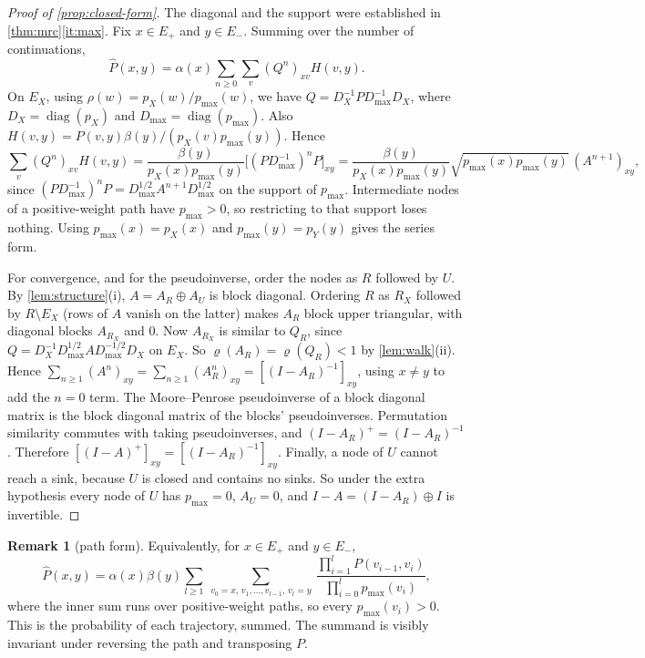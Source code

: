 \documentclass[11pt]{article}
\theoremstyle{definition}
\newtheorem{remark}[theorem]{Remark}
\newcommand{\pX}{p_X}
\newcommand{\pY}{p_Y}
\newcommand{\hP}{\hat P}
\newcommand{\pmax}{p_{\max}}
\newcommand{\Ep}{E_{+}}
\newcommand{\Em}{E_{-}}
\begin{document}
\begin{proof}[Proof of \cref{prop:closed-form}]
The diagonal and the support were established in
\cref{thm:mrc}\ref{it:max}. Fix $x\in\Ep$ and $y\in\Em$. Summing over the
number of continuations,
\[
  \hP(x,y)=\alpha(x)\sum_{n\ge0}\sum_{v}(Q^n)_{xv}H(v,y).
\]
On $E_X$, using $\rho(w)=\pX(w)/\pmax(w)$, we have
$Q=D_X^{-1}PD_{\max}^{-1}D_X$, where $D_X=\operatorname{diag}(\pX)$ and
$D_{\max}=\operatorname{diag}(\pmax)$. Also
$H(v,y)=P(v,y)\beta(y)/(\pX(v)\pmax(y))$. Hence
\[
  \sum_v(Q^n)_{xv}H(v,y)=\frac{\beta(y)}{\pX(x)\pmax(y)}\bigl[(PD_{\max}^{-1})^nP\bigr]_{xy}
  =\frac{\beta(y)}{\pX(x)\pmax(y)}\sqrt{\pmax(x)\pmax(y)}\,(A^{n+1})_{xy},
\]
since $(PD_{\max}^{-1})^nP=D_{\max}^{1/2}A^{n+1}D_{\max}^{1/2}$ on the support of
$\pmax$. Intermediate nodes of a positive-weight path have $\pmax>0$, so
restricting to that support loses nothing. Using $\pmax(x)=\pX(x)$ and
$\pmax(y)=\pY(y)$ gives the series form.

For convergence, and for the pseudoinverse, order the nodes as $R$ followed by
$U$. By \cref{lem:structure}(i), $A=A_R\oplus A_U$ is block diagonal. Ordering
$R$ as $R_X$ followed by $R\setminus E_X$ (rows of $A$ vanish on the latter)
makes $A_R$ block upper triangular, with diagonal blocks $A_{R_X}$ and $0$. Now
$A_{R_X}$ is similar to $Q_R$, since
$Q=D_X^{-1}D_{\max}^{1/2}AD_{\max}^{-1/2}D_X$ on $E_X$. So
$\varrho(A_R)=\varrho(Q_R)<1$ by \cref{lem:walk}(ii). Hence
$\sum_{n\ge1}(A^n)_{xy}=\sum_{n\ge1}(A_R^n)_{xy}=[(I-A_R)^{-1}]_{xy}$, using
$x\ne y$ to add the $n=0$ term. The Moore--Penrose pseudoinverse of a block
diagonal matrix is the block diagonal matrix of the blocks' pseudoinverses.
Permutation similarity commutes with taking pseudoinverses, and
$(I-A_R)^+=(I-A_R)^{-1}$. Therefore $[(I-A)^{+}]_{xy}=[(I-A_R)^{-1}]_{xy}$.
Finally, a node of $U$ cannot reach a sink, because $U$ is closed and contains
no sinks. So under the extra hypothesis every node of $U$ has $\pmax=0$, $A_U=0$,
and $I-A=(I-A_R)\oplus I$ is invertible.
\end{proof}

\begin{remark}[path form]
Equivalently, for $x\in\Ep$ and $y\in\Em$,
\[
\hP(x,y)=\alpha(x)\beta(y)\sum_{l\ge1}\ \sum_{v_0=x,\,v_1,\dots,v_{l-1},\,v_l=y}\ \frac{\prod_{i=1}^{l}P(v_{i-1},v_i)}{\prod_{i=0}^{l}\pmax(v_i)},
\]
where the inner sum runs over positive-weight paths, so every $\pmax(v_i)>0$.
This is the probability of each trajectory, summed. The summand is visibly
invariant under reversing the path and transposing $P$.
\end{remark}
\end{document}
